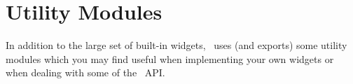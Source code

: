 \chapter{Utility Modules}
\label{chap:utility}

In addition to the large set of built-in widgets, \vtyui\ uses (and
exports) some utility modules which you may find useful when
implementing your own widgets or when dealing with some of the
\vtyui\ API.



